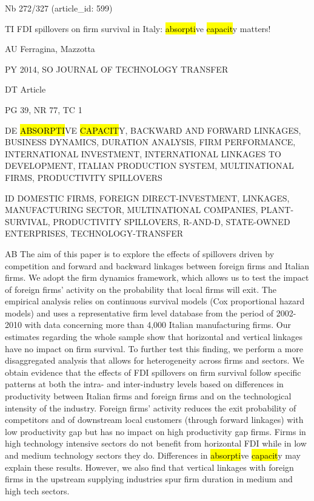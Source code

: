 \documentclass[a4paper]{article}
\begin{document}
\vspace*{-2cm}
Nb \tabto{0cm}272/327 (article\_id: 599)\par
TI \tabto{0cm}FDI spillovers on firm survival in Italy: \hl{absorpti}ve \hl{capacit}y matters!\par
AU \tabto{0cm}Ferragina, Mazzotta\par
PY \tabto{0cm}2014, SO JOURNAL OF TECHNOLOGY TRANSFER\par
DT \tabto{0cm}Article\par
PG \tabto{0cm}39, NR 77, TC 1\par
DE \tabto{0cm}\hl{ABSORPTI}VE \hl{CAPACIT}Y, BACKWARD AND FORWARD LINKAGES, BUSINESS DYNAMICS, DURATION ANALYSIS, FIRM PERFORMANCE, INTERNATIONAL INVESTMENT, INTERNATIONAL LINKAGES TO DEVELOPMENT, ITALIAN PRODUCTION SYSTEM, MULTINATIONAL FIRMS, PRODUCTIVITY SPILLOVERS\par
ID \tabto{0cm}DOMESTIC FIRMS, FOREIGN DIRECT-INVESTMENT, LINKAGES, MANUFACTURING SECTOR, MULTINATIONAL COMPANIES, PLANT-SURVIVAL, PRODUCTIVITY SPILLOVERS, R-AND-D, STATE-OWNED ENTERPRISES, TECHNOLOGY-TRANSFER\par
AB \tabto{0cm}The aim of this paper is to explore the effects of spillovers driven by competition and forward and backward linkages between foreign firms and Italian firms. We adopt the firm dynamics framework, which allows us to test the impact of foreign firms' activity on the probability that local firms will exit. The empirical analysis relies on continuous survival models (Cox proportional hazard models) and uses a representative firm level database from the period of 2002-2010 with data concerning more than 4,000 Italian manufacturing firms. Our estimates regarding the whole sample show that horizontal and vertical linkages have no impact on firm survival. To further test this finding, we perform a more disaggregated analysis that allows for heterogeneity across firms and sectors. We obtain evidence that the effects of FDI spillovers on firm survival follow specific patterns at both the intra- and inter-industry levels based on differences in productivity between Italian firms and foreign firms and on the technological intensity of the industry. Foreign firms' activity reduces the exit probability of competitors and of downstream local customers (through forward linkages) with low productivity gap but has no impact on high productivity gap firms. Firms in high technology intensive sectors do not benefit from horizontal FDI while in low and medium technology sectors they do. Differences in \hl{absorpti}ve \hl{capacit}y may explain these results. However, we also find that vertical linkages with foreign firms in the upstream supplying industries spur firm duration in medium and high tech sectors.\par
\clearpage
\end{document}
